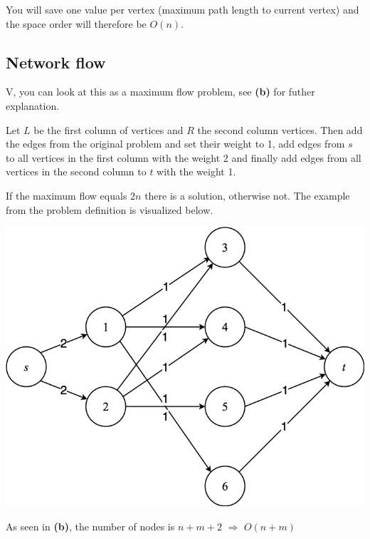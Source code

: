 \documentclass[a4paper]{article}
\newenvironment{task}[1]
{
	\begin{description}[align=right]
		\item [#1]
}{		%
	\end{description}
}
\newcommand{\taskref}[1]{\textbf{#1}}
\DeclareMathOperator{\ra}{\ \Rightarrow\ }
\DeclareMathOperator{\*}{\cdot}
\begin{document}
\begin{task}{(d)}
	 You will save one value per vertex (maximum path length to current vertex) and the space order will therefore be $O(n)$.
\end{task}

\subsection*{Network flow}

\begin{task}{5. (a)}
	 V, you can look at this as a maximum flow problem, see \taskref{(b)} for futher explanation.
\end{task}

\begin{task}{(b)}
	\qquad Let $L$ be the first column of vertices and $R$ the second column vertices. Then add the edges from the original problem and set their weight to 1, add edges from $s$ to all vertices in the first column with the weight 2 and finally add edges from all vertices in the second column to $t$ with the weight 1.
	
	If the maximum flow equals $2n$ there is a solution, otherwise not. The example from the problem definition is visualized below.
	
	\includegraphics[scale=0.3]{140526-5b.png}
\end{task}

\begin{task}{(c)}
	 As seen in \taskref{(b)}, the number of nodes is $n+m+2\ra O(n+m)$
\end{task}
\end{document}
